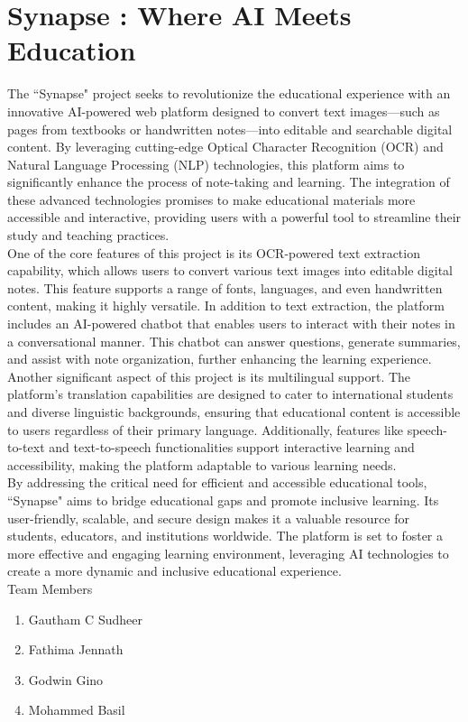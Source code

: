 \documentclass[12pt]{book}
\begin{document}
	\thispagestyle{empty}
	\section*{Synapse : Where AI Meets Education}
	The ``Synapse" project seeks to revolutionize the educational experience with an innovative AI-powered web platform designed to convert text images—such as pages from textbooks or handwritten notes—into editable and searchable digital content. By leveraging cutting-edge Optical Character Recognition (OCR) and Natural Language Processing (NLP) technologies, this platform aims to significantly enhance the process of note-taking and learning. The integration of these advanced technologies promises to make educational materials more accessible and interactive, providing users with a powerful tool to streamline their study and teaching practices.\\
	
	One of the core features of this project is its OCR-powered text extraction capability, which allows users to convert various text images into editable digital notes. This feature supports a range of fonts, languages, and even handwritten content, making it highly versatile. In addition to text extraction, the platform includes an AI-powered chatbot that enables users to interact with their notes in a conversational manner. This chatbot can answer questions, generate summaries, and assist with note organization, further enhancing the learning experience. Another significant aspect of this project is its multilingual support. The platform’s translation capabilities are designed to cater to international students and diverse linguistic backgrounds, ensuring that educational content is accessible to users regardless of their primary language. Additionally, features like speech-to-text and text-to-speech functionalities support interactive learning and accessibility, making the platform adaptable to various learning needs.\\
	
	By addressing the critical need for efficient and accessible educational tools, ``Synapse" aims to bridge educational gaps and promote inclusive learning. Its user-friendly, scalable, and secure design makes it a valuable resource for students, educators, and institutions worldwide. The platform is set to foster a more effective and engaging learning environment, leveraging AI technologies to create a more dynamic and inclusive educational experience.\\
	
	\bigskip
	Team Members
	\begin{enumerate}
		\item Gautham C Sudheer
		\item Fathima Jennath
		\item Godwin Gino
		\item Mohammed Basil
	\end{enumerate}
	\bigskip
	
\end{document}
